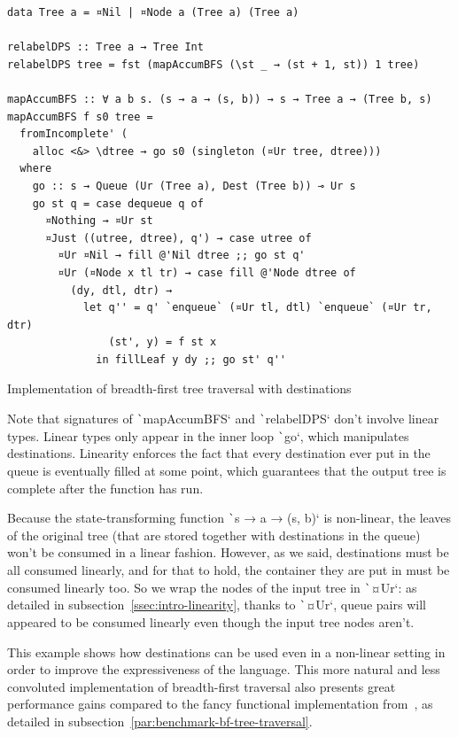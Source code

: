 \documentclass[english]{jflart}
\begin{document}
\begin{table}[t]
\small
\begin{verbatim}
data Tree a = ¤Nil | ¤Node a (Tree a) (Tree a)

relabelDPS :: Tree a → Tree Int
relabelDPS tree = fst (mapAccumBFS (\st _ → (st + 1, st)) 1 tree)

mapAccumBFS :: ∀ a b s. (s → a → (s, b)) → s → Tree a → (Tree b, s)
mapAccumBFS f s0 tree =
  fromIncomplete' (
    alloc <&> \dtree → go s0 (singleton (¤Ur tree, dtree)))
  where
    go :: s → Queue (Ur (Tree a), Dest (Tree b)) ⊸ Ur s
    go st q = case dequeue q of
      ¤Nothing → ¤Ur st
      ¤Just ((utree, dtree), q') → case utree of
        ¤Ur ¤Nil → fill @'Nil dtree ;; go st q'
        ¤Ur (¤Node x tl tr) → case fill @'Node dtree of
          (dy, dtl, dtr) →
            let q'' = q' `enqueue` (¤Ur tl, dtl) `enqueue` (¤Ur tr, dtr)
                (st', y) = f st x
              in fillLeaf y dy ;; go st' q''
\end{verbatim}
\caption{Implementation of breadth-first tree traversal with destinations}
\label{table:impl-bfs-tree-traversal}
\end{table}

Note that signatures of \texttt`mapAccumBFS` and \texttt`relabelDPS` don't involve linear types. Linear types only appear in the inner loop \texttt`go`, which manipulates destinations. Linearity enforces the fact that every destination ever put in the queue is eventually filled at some point, which guarantees that the output tree is complete after the function has run.

Because the state-transforming function \texttt`s → a → (s, b)` is non-linear, the leaves of the original tree (that are stored together with destinations in the queue) won't be consumed in a linear fashion. However, as we said, destinations must be all consumed linearly, and for that to hold, the container they are put in must be consumed linearly too. So we wrap the nodes of the input tree in \texttt`¤Ur`: as detailed in subsection~\ref{ssec:intro-linearity}, thanks to \texttt`¤Ur`, queue pairs will appeared to be consumed linearly even though the input tree nodes aren't.

This example shows how destinations can be used even in a non-linear setting in order to improve the expressiveness of the language. This more natural and less convoluted implementation of breadth-first traversal also presents great performance gains compared to the fancy functional implementation from~\cite{gibbons_phases_2023}, as detailed in subsection~\ref{par:benchmark-bf-tree-traversal}.
\end{document}
